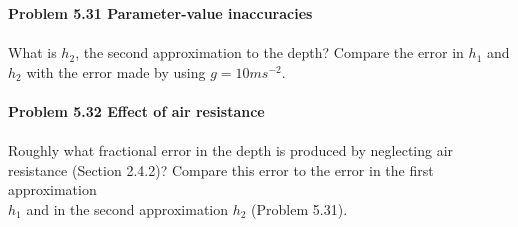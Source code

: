 \documentclass{book}
\begin{document}
\large\textrm{ \textbf{Problem 5.31 Parameter-value inaccuracies}\\ 
\\ 
What is $h_{2}$, the second approximation to the depth? Compare the error in $h_{1}$ 
and $h_{2}$ with the error made by using $g=10ms^{-2}$.\\ 
\\ 
\large\textbf{Problem 5.32 Effect of air resistance}\\ 
\\ 
Roughly what fractional error in the depth is produced by neglecting air resistance (Section 2.4.2)? Compare this error to the error in the first approximation \\ 
$h_{1}$ and in the second approximation $h_{2}$ (Problem 5.31).} \\ 
\newpage 
\pagestyle{fancy} 
\renewcommand{\headrulewidth}{0pt} 
\fancyhf{} %

\end{document}
